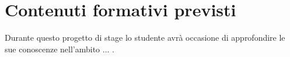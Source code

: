 \section{Contenuti formativi previsti}
Durante questo progetto di stage lo studente avrà occasione di approfondire le sue conoscenze nell'ambito ... .
\newpage